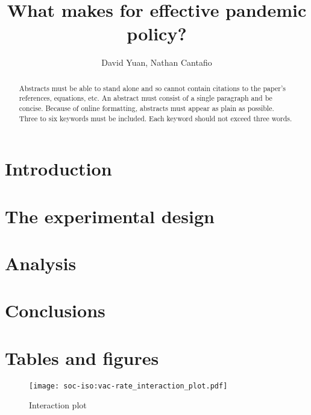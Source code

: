 \documentclass[12pt,a4paper]{article}
\title{What makes for effective pandemic policy?}
\author{David Yuan, Nathan Cantafio}
\date{}  %
\begin{document}
\maketitle

\begin{abstract}
Abstracts must be able to stand alone and so cannot contain citations to the paper’s references, equations, etc. An abstract must consist of a single paragraph and be concise. Because of online formatting, abstracts must appear as plain as possible. Three to six keywords must be included. Each keyword should not exceed three words. %
\end{abstract} 

\section{Introduction}

\cite{TURKYILMAZOGLU2022127429} %

\section{The experimental design}
\section{Analysis}

\section{Conclusions}

\section{Tables and figures}

\begin{figure}[H]
\texttt{[image: soc-iso:vac-rate\_interaction\_plot.pdf]}
\caption{Interaction plot}	 %
\label{soc.iso:vac.rate_interaction}
\end{figure}




\printbibliography
\end{document}
